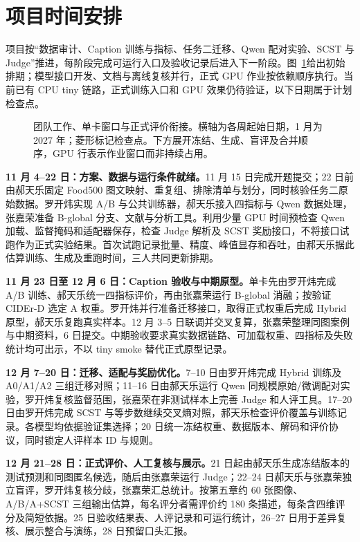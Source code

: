 \section{项目时间安排}
\label{sec:schedule}
项目按“数据审计、Caption 训练与指标、任务二迁移、Qwen 配对实验、SCST 与 Judge”推进，每阶段完成可运行入口及验收记录后进入下一阶段。图~\ref{fig:team-timeline}给出初始排期；模型接口开发、文档与离线复核并行，正式 GPU 作业按依赖顺序执行。当前已有 CPU tiny 链路，正式训练入口和 GPU 效果仍待验证，以下日期属于计划检查点。

\begin{figure}[!ht]
\centering
\caption{团队工作、单卡窗口与正式评价衔接。横轴为各周起始日期，1 月为 2027 年；菱形标记检查点。下方展开冻结、生成、盲评及合并顺序，GPU 行表示作业窗口而非持续占用。}
\label{fig:team-timeline}
\end{figure}

\textbf{11 月 4--22 日：方案、数据与运行条件就绪。}11 月 15 日完成开题提交；22 日前由郝天乐固定 Food500 图文映射、重复组、排除清单与划分，同时核验任务二原始数据。罗开炜实现 A/B 与公共训练器，郝天乐接入四指标与 Qwen 数据处理，张嘉荣准备 B-global 分支、文献与分析工具。利用少量 GPU 时间预检查 Qwen 加载、监督掩码和适配器保存，检查 Judge 解析及 SCST 奖励接口，不将接口试跑作为正式实验结果。首次试跑记录批量、精度、峰值显存和吞吐，由郝天乐据此估算训练、生成及重跑时间，三人共同更新排期。

\textbf{11 月 23 日至 12 月 6 日：Caption 验收与中期原型。}单卡先由罗开炜完成 A/B 训练、郝天乐统一四指标评价，再由张嘉荣运行 B-global 消融；按验证 CIDEr-D 选定 A 权重。罗开炜并行准备迁移接口，取得正式权重后完成 Hybrid 原型，郝天乐复跑真实样本。12 月 3--5 日联调并交叉复算，张嘉荣整理同图案例与中期资料，6 日提交。中期验收要求真实数据链路、可加载权重、四指标及失败统计均可出示，不以 tiny smoke 替代正式原型记录。

\textbf{12 月 7--20 日：迁移、适配与奖励优化。}7--10 日由罗开炜完成 Hybrid 训练及 A0/A1/A2 三组迁移对照；11--16 日由郝天乐运行 Qwen 同规模原始/微调配对实验，罗开炜复核监督范围，张嘉荣在非测试样本上完善 Judge 和人评工具。17--20 日由罗开炜完成 SCST 与等步数继续交叉熵对照，郝天乐检查评价覆盖与训练记录。各模型均依据验证集选择；20 日统一冻结权重、数据版本、解码和评价协议，同时锁定人评样本 ID 与规则。

\textbf{12 月 21--28 日：正式评价、人工复核与展示。}21 日起由郝天乐生成冻结版本的测试预测和同图匿名候选，随后由张嘉荣运行 Judge；22--24 日郝天乐与张嘉荣独立盲评，罗开炜复核分歧，张嘉荣汇总统计。按第五章约 60 张图像、A/B/A+SCST 三组输出估算，每名评分者需评价约 180 条描述，每条含四维评分及简短依据。25 日验收结果表、人评记录和可运行统计，26--27 日用于差异复核、展示整合与演练，28 日预留口头汇报。

